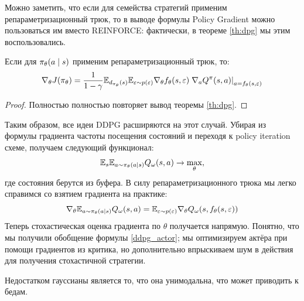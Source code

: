 Можно заметить, что если для семейства стратегий применим репараметризационный трюк, то в выводе формулы Policy Gradient можно пользоваться им вместо REINFORCE: фактически, в теореме \ref{th:dpg} мы этим воспользовались.

\begin{theorem}
Если для $\pi_\theta(a \HM\mid s)$ применим репараметризационный трюк, то:
\begin{equation}\label{rt_dpg}
\nabla_\theta J(\pi_\theta) = \frac{1}{1 - \gamma}\E_{d_{\pi_\theta}(s)} \E_{\eps \HM\sim p(\eps)} \nabla_\theta f_\theta(s, \eps) \left. \nabla_a Q^{\pi}(s, a) \right|_{a = f_\theta(s, \eps)}
\end{equation}
\begin{proof}
Полностью полностью повторяет вывод теоремы \ref{th:dpg}.
\end{proof}
\end{theorem}

Таким образом, все идеи DDPG расширяются на этот случай. Убирая из формулы градиента частоты посещения состояний и переходя к policy iteration схеме, получаем следующий функционал:
\begin{equation}\label{general_pi_ddpg}
\mathbb{E}_s \mathbb{E}_{a \sim \pi_\theta(a \mid s)} Q_\omega(s, a) \to \max_{\theta},
\end{equation}
где состояния берутся из буфера. В силу репараметризационного трюка мы легко справимся со взятием градиента на практике:
\begin{equation*}
\nabla_\theta \mathbb{E}_{a \sim \pi_\theta(a \mid s)} Q_\omega(s, a) = \mathbb{E}_{\varepsilon \sim p(\varepsilon)} \nabla_\theta Q_\omega(s, f_{\theta}(s, \varepsilon))
\end{equation*}
Теперь стохастическая оценка градиента по $\theta$ получается напрямую. Понятно, что мы получили обобщение формулы \eqref{ddpg_actor}; мы оптимизируем актёра при помощи градиентов из критика, но дополнительно впрыскиваем шум в действия для получения стохастичной стратегии. 

Недостатком гауссианы является то, что она унимодальна, что может приводить к бедам.

